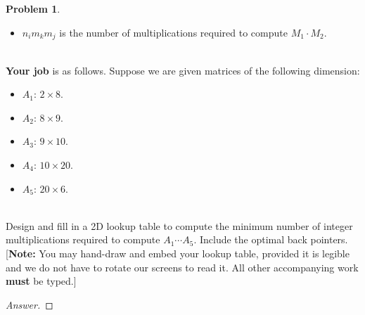 \documentclass[11pt]{article}
\theoremstyle{definition}
\theoremstyle{definition}
\newtheorem{required}{Problem}
\theoremstyle{definition}
\begin{document}
\begin{required}
\begin{itemize}
\item $n_{i}m_{k}m_{j}$ is the number of multiplications required to compute $M_{1} \cdot M_{2}$. 
\end{itemize}


\noindent \\ \textbf{Your job} is as follows. Suppose we are given matrices of the following dimension:
\begin{itemize}
\item $A_{1}$: $2 \times 8$.
\item $A_{2}$: $8 \times 9$.
\item $A_{3}$: $9 \times 10$.
\item $A_{4}$: $10 \times 20$.
\item $A_{5}$: $20 \times 6$.
\end{itemize}

\noindent \\ Design and fill in a 2D lookup table to compute the minimum number of integer multiplications required to compute $A_{1} \cdots A_{5}$. Include the optimal back pointers. [\textbf{Note:} You may hand-draw and embed your lookup table, provided it is legible and we do not have to rotate our screens to read it. All other accompanying work \textbf{must} be typed.]
\end{required}

\begin{proof}[Answer]
\end{proof}
\end{document}
